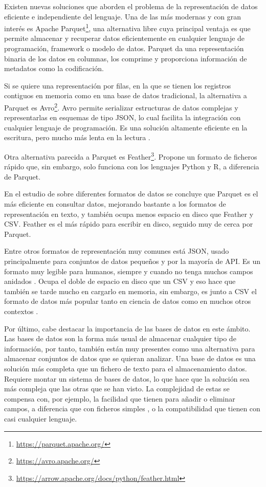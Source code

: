 Existen nuevas soluciones que aborden el problema de la representación de datos
eficiente e independiente del lenguaje. Una de las más modernas y con gran
interés es Apache Parquet\footnote{\url{https://parquet.apache.org/}}, una
alternativa libre cuya principal ventaja es que permite almacenar y recuperar
datos eficientemente en cualquier lenguaje de programación, framework o modelo
de datos. Parquet da una representación binaria de los datos en columnas, los
comprime y proporciona información de metadatos como la codificación.

Si se quiere una representación por filas, en la que se tienen los registros
contiguos en memoria como en una base de datos tradicional, la alternativa a
Parquet es Avro\footnote{\url{https://avro.apache.org/}}. Avro permite
serializar estructuras de datos complejas y representarlas en esquemas de tipo
JSON, lo cual facilita la integración con cualquier lenguaje de programación. Es
una solución altamente eficiente en la escritura, pero mucho más lenta en la
lectura \cite{ramos_big_2023}.

Otra alternativa parecida a Parquet es
Feather\footnote{\url{https://arrow.apache.org/docs/python/feather.html}}.
Propone un formato de ficheros rápido que, sin embargo, solo funciona con los
lenguajes Python y R, a diferencia de Parquet.

En el estudio de \cite{murallie_csvs_2022} sobre diferentes formatos de datos se
concluye que Parquet es el más eficiente en consultar datos, mejorando bastante
a los formatos de representación en texto, y también ocupa menos espacio en
disco que Feather y CSV. Feather es el más rápido para escribir en disco,
seguido muy de cerca por Parquet. 

Entre otros formatos de representación muy comunes está JSON, usado
principalmente para conjuntos de datos pequeños y por la mayoría de API. Es un
formato muy legible para humanos, siempre y cuando no tenga muchos campos
anidados \cite{ramos_big_2023}. Ocupa el doble de espacio en disco que un CSV y
eso hace que también se tarde mucho en cargarlo en memoria, sin embargo, es
junto a CSV el formato de datos más popular tanto en ciencia de datos como en
muchos otros contextos \cite{murallie_csvs_2022}.

Por último, cabe destacar la importancia de las bases de datos en este ámbito.
Las bases de datos son la forma más usual de almacenar cualquier tipo de
información, por tanto, también están muy presentes como una alternativa para
almacenar conjuntos de datos que se quieran analizar. Una base de datos es una
solución más completa que un fichero de texto para el almacenamiento datos.
Requiere montar un sistema de bases de datos, lo que hace que la solución sea
más compleja que las otras que se han visto. La complejidad de estas se compensa
con, por ejemplo, la facilidad que tienen para añadir o eliminar campos, a
diferencia que con ficheros simples \cite{ramos_big_2023}, o la compatibilidad
que tienen con casi cualquier lenguaje.

